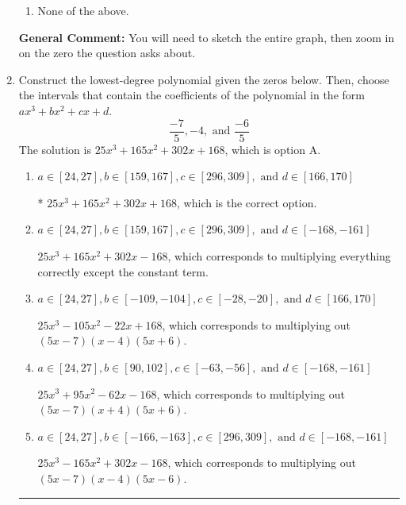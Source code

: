 \documentclass{extbook}[14pt]
\newcommand{\litem}[1]{\item #1

\rule{\textwidth}{0.4pt}}
\begin{document}
\begin{enumerate}
{\begin{enumerate}[label=\Alph*.]
\item None of the above.\end{enumerate}
\textbf{General Comment:} You will need to sketch the entire graph, then zoom in on the zero the question asks about.
}
\litem{
Construct the lowest-degree polynomial given the zeros below. Then, choose the intervals that contain the coefficients of the polynomial in the form $ax^3+bx^2+cx+d$.
\[ \frac{-7}{5}, -4, \text{ and } \frac{-6}{5} \]The solution is \( 25x^{3} +165 x^{2} +302 x + 168 \), which is option A.\begin{enumerate}[label=\Alph*.]
\item \( a \in [24, 27], b \in [159, 167], c \in [296, 309], \text{ and } d \in [166, 170] \)

* $25x^{3} +165 x^{2} +302 x + 168$, which is the correct option.
\item \( a \in [24, 27], b \in [159, 167], c \in [296, 309], \text{ and } d \in [-168, -161] \)

$25x^{3} +165 x^{2} +302 x -168$, which corresponds to multiplying everything correctly except the constant term.
\item \( a \in [24, 27], b \in [-109, -104], c \in [-28, -20], \text{ and } d \in [166, 170] \)

$25x^{3} -105 x^{2} -22 x + 168$, which corresponds to multiplying out $(5x -7)(x -4)(5x + 6)$.
\item \( a \in [24, 27], b \in [90, 102], c \in [-63, -56], \text{ and } d \in [-168, -161] \)

$25x^{3} +95 x^{2} -62 x -168$, which corresponds to multiplying out $(5x -7)(x + 4)(5x + 6)$.
\item \( a \in [24, 27], b \in [-166, -163], c \in [296, 309], \text{ and } d \in [-168, -161] \)

$25x^{3} -165 x^{2} +302 x -168$, which corresponds to multiplying out $(5x -7)(x -4)(5x -6)$.
\end{enumerate}

}
\end{enumerate}
\end{document}
